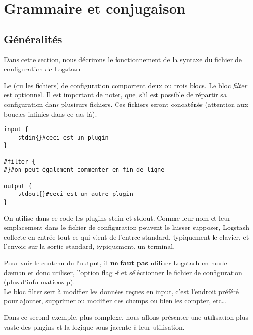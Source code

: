 \section{Grammaire et conjugaison}
\subsection{Généralités}
Dans cette section, nous décrirons le fonctionnement de la syntaxe du fichier de 
configuration de Logstash.

Le (ou les fichiers) de configuration comportent deux ou trois blocs. 
Le bloc \emph{filter} est optionnel.
Il est important de noter, que, s'il est possible de répartir sa configuration dans
plusieurs fichiers. Ces fichiers seront concaténés (attention aux boucles infinies
dans ce cas là).

\begin{lstlisting}[style=logstash,label={lst:conflogstashminimale},caption={Configuration minimale}]
input {
    stdin{}#ceci est un plugin
}

#filter {
#}#on peut également commenter en fin de ligne

output {
    stdout{}#ceci est un autre plugin
}
\end{lstlisting}

On utilise dans ce code les plugins stdin et stdout. Comme leur nom et leur emplacement
dans le fichier de configuration peuvent le laisser supposer,
Logstash collecte en entrée tout ce qui vient de l'entrée standard, typiquement
le clavier, et l'envoie sur la sortie standard, typiquement, un terminal.

Pour voir le contenu de l'output, il \textbf{ne faut pas} utiliser Logstash en mode dæmon 
et donc utiliser, l'option flag -f et séléctionner le fichier de configuration  
(plus d'informations p\pageref{subsec:logstashflag}).\\[4mm]

Le bloc filter sert à modifier les données reçues en input, c'est l'endroit préféré
pour ajouter, supprimer ou modifier des champs ou bien les compter, etc\ldots


Dans ce second exemple, plus complexe, nous allons présenter une utilisation plus
vaste des plugins et la logique sous-jacente à leur utilisation.

